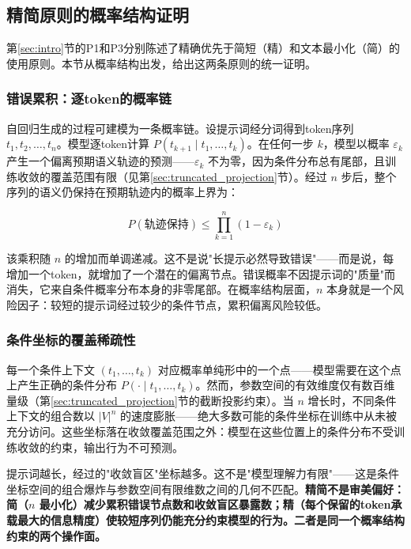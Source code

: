 \documentclass[11pt,a4paper]{article}
\theoremstyle{definition}
\begin{document}
\subsection{精简原则的概率结构证明}
\label{sec:precision_proof}

第\ref{sec:intro}节的P1和P3分别陈述了精确优先于简短（精）和文本最小化（简）的使用原则。本节从概率结构出发，给出这两条原则的统一证明。

\subsubsection{错误累积：逐token的概率链}

自回归生成的过程可建模为一条概率链。设提示词经分词得到token序列 $t_1, t_2, \ldots, t_n$。模型逐token计算 $P(t_{k+1} \mid t_1, \ldots, t_k)$。在任何一步 $k$，模型以概率 $\varepsilon_k$ 产生一个偏离预期语义轨迹的预测——$\varepsilon_k$ 不为零，因为条件分布总有尾部，且训练收敛的覆盖范围有限（见第\ref{sec:truncated_projection}节）。经过 $n$ 步后，整个序列的语义仍保持在预期轨迹内的概率上界为：

\begin{equation}
P(\text{轨迹保持}) \leq \prod_{k=1}^{n} (1-\varepsilon_k)
\end{equation}

该乘积随 $n$ 的增加而单调递减。这不是说"长提示必然导致错误"——而是说，每增加一个token，就增加了一个潜在的偏离节点。错误概率不因提示词的"质量"而消失，它来自条件概率分布本身的非零尾部。在概率结构层面，$n$ 本身就是一个风险因子：较短的提示词经过较少的条件节点，累积偏离风险较低。

\subsubsection{条件坐标的覆盖稀疏性}

每一个条件上下文 $(t_1, \ldots, t_k)$ 对应概率单纯形中的一个点——模型需要在这个点上产生正确的条件分布 $P(\cdot \mid t_1, \ldots, t_k)$。然而，参数空间的有效维度仅有数百维量级（第\ref{sec:truncated_projection}节的截断投影约束）。当 $n$ 增长时，不同条件上下文的组合数以 $|V|^n$ 的速度膨胀——绝大多数可能的条件坐标在训练中从未被充分访问。这些坐标落在收敛覆盖范围之外：模型在这些位置上的条件分布不受训练收敛的约束，输出行为不可预测。

提示词越长，经过的"收敛盲区"坐标越多。这不是"模型理解力有限"——这是条件坐标空间的组合爆炸与参数空间有限维数之间的几何不匹配。\textbf{精简不是审美偏好：简（$n$ 最小化）减少累积错误节点数和收敛盲区暴露数；精（每个保留的token承载最大的信息精度）使较短序列仍能充分约束模型的行为。二者是同一个概率结构约束的两个操作面。}
\end{document}
